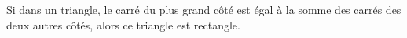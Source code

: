 Si dans un triangle, le carré du plus grand côté est égal à la
somme des carrés des deux autres côtés, alors ce triangle est rectangle.